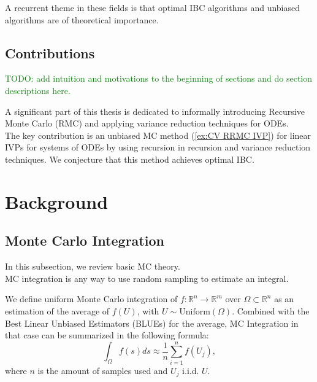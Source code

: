 \documentclass[a4paper,12pt]{article}
\begin{document}
A recurrent theme in these fields is that optimal IBC
algorithms and unbiased algorithms
are of theoretical importance.

\subsection{Contributions}

\textcolor{green}{
    TODO: add intuition and motivations to the beginning of sections
    and do section descriptions here.\\
}

A significant part of this thesis is dedicated to
informally introducing Recursive Monte Carlo (RMC)
and applying variance reduction techniques for ODEs. \\

The key contribution is an unbiased MC method
(\ref{ex:CV RRMC IVP}) for
linear IVPs for systems of ODEs by using recursion in recursion
and variance reduction techniques.
We conjecture that this method achieves optimal IBC.

\section{Background}

\subsection{Monte Carlo Integration}

In this subsection, we review basic MC theory. \\

MC integration is any way to
use random sampling to estimate an integral.

\begin{definition}
    We define uniform Monte Carlo integration of
    $f:\mathbb{R}^{n} \rightarrow \mathbb{R}^{m}$
    over $\Omega \subset \mathbb{R}^{n}$ as
    an estimation of the average of $f(U)$, with
    $U \sim \text{Uniform}(\Omega)$. Combined
    with the Best Linear Unbiased Estimators (BLUEs) for the average, MC Integration
    in that case can be summarized in the following formula:
    \begin{equation}
        \int_{\Omega} f(s)ds \approx \frac{1}{n} \sum_{i=1}^{n}f(U_{j}),
    \end{equation}
    where $n$ is the amount of samples used and $U_{j}$ i.i.d. $U$.
\end{definition}
\end{document}
